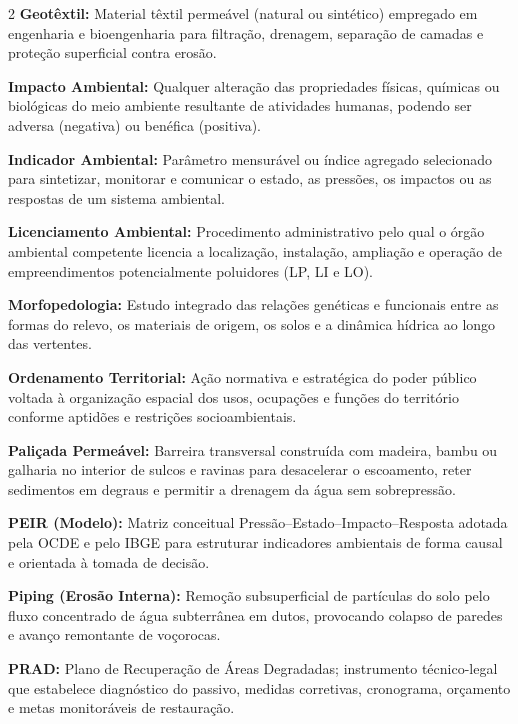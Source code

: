 \begin{multicols}{2}
\noindent\textbf{\color{uefsNavy}Geotêxtil:} Material têxtil permeável (natural ou sintético) empregado em engenharia e bioengenharia para filtração, drenagem, separação de camadas e proteção superficial contra erosão.

\noindent\textbf{\color{uefsNavy}Impacto Ambiental:} Qualquer alteração das propriedades físicas, químicas ou biológicas do meio ambiente resultante de atividades humanas, podendo ser adversa (negativa) ou benéfica (positiva).

\noindent\textbf{\color{uefsNavy}Indicador Ambiental:} Parâmetro mensurável ou índice agregado selecionado para sintetizar, monitorar e comunicar o estado, as pressões, os impactos ou as respostas de um sistema ambiental.

\noindent\textbf{\color{uefsNavy}Licenciamento Ambiental:} Procedimento administrativo pelo qual o órgão ambiental competente licencia a localização, instalação, ampliação e operação de empreendimentos potencialmente poluidores (LP, LI e LO).

\noindent\textbf{\color{uefsNavy}Morfopedologia:} Estudo integrado das relações genéticas e funcionais entre as formas do relevo, os materiais de origem, os solos e a dinâmica hídrica ao longo das vertentes.

\noindent\textbf{\color{uefsNavy}Ordenamento Territorial:} Ação normativa e estratégica do poder público voltada à organização espacial dos usos, ocupações e funções do território conforme aptidões e restrições socioambientais.

\noindent\textbf{\color{uefsNavy}Paliçada Permeável:} Barreira transversal construída com madeira, bambu ou galharia no interior de sulcos e ravinas para desacelerar o escoamento, reter sedimentos em degraus e permitir a drenagem da água sem sobrepressão.

\noindent\textbf{\color{uefsNavy}PEIR (Modelo):} Matriz conceitual Pressão--Estado--Impacto--Resposta adotada pela OCDE e pelo IBGE para estruturar indicadores ambientais de forma causal e orientada à tomada de decisão.

\noindent\textbf{\color{uefsNavy}Piping (Erosão Interna):} Remoção subsuperficial de partículas do solo pelo fluxo concentrado de água subterrânea em dutos, provocando colapso de paredes e avanço remontante de voçorocas.

\noindent\textbf{\color{uefsNavy}PRAD:} Plano de Recuperação de Áreas Degradadas; instrumento técnico-legal que estabelece diagnóstico do passivo, medidas corretivas, cronograma, orçamento e metas monitoráveis de restauração.


\end{multicols}
